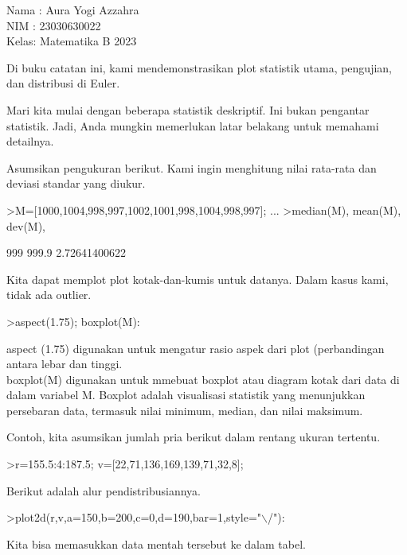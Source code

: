 \documentclass[a4paper,10pt]{article}
\begin{document}
\begin{eulernotebook}
\begin{eulercomment}
Nama : Aura Yogi Azzahra\\
NIM  : 23030630022\\
Kelas: Matematika B 2023

\begin{eulercomment}
\begin{eulercomment}
Di buku catatan ini, kami mendemonstrasikan plot statistik utama,
pengujian, dan distribusi di Euler.

Mari kita mulai dengan beberapa statistik deskriptif. Ini bukan
pengantar statistik. Jadi, Anda mungkin memerlukan latar belakang
untuk memahami detailnya.

Asumsikan pengukuran berikut. Kami ingin menghitung nilai rata-rata
dan deviasi standar yang diukur.
\end{eulercomment}
\begin{eulerprompt}
>M=[1000,1004,998,997,1002,1001,998,1004,998,997]; ...
>median(M), mean(M), dev(M),
\end{eulerprompt}
\begin{euleroutput}
  999
  999.9
  2.72641400622
\end{euleroutput}
\begin{eulercomment}
Kita dapat memplot plot kotak-dan-kumis untuk datanya. Dalam kasus
kami, tidak ada outlier.
\end{eulercomment}
\begin{eulerprompt}
>aspect(1.75); boxplot(M):
\end{eulerprompt}
\begin{eulercomment}
aspect (1.75) digunakan untuk mengatur rasio aspek dari plot
(perbandingan antara lebar dan tinggi.\\
boxplot(M) digunakan untuk mmebuat boxplot atau diagram kotak dari
data di dalam variabel M. Boxplot adalah visualisasi statistik yang
menunjukkan persebaran data, termasuk nilai minimum, median, dan nilai
maksimum.

Contoh, kita asumsikan jumlah pria berikut dalam rentang ukuran
tertentu.
\end{eulercomment}
\begin{eulerprompt}
>r=155.5:4:187.5; v=[22,71,136,169,139,71,32,8];
\end{eulerprompt}
\begin{eulercomment}
Berikut adalah alur pendistribusiannya.
\end{eulercomment}
\begin{eulerprompt}
>plot2d(r,v,a=150,b=200,c=0,d=190,bar=1,style="\(\backslash\)/"):
\end{eulerprompt}
\begin{eulercomment}
Kita bisa memasukkan data mentah tersebut ke dalam tabel.


\end{eulercomment}
\end{eulercomment}
\end{eulercomment}
\end{eulernotebook}
\end{document}
